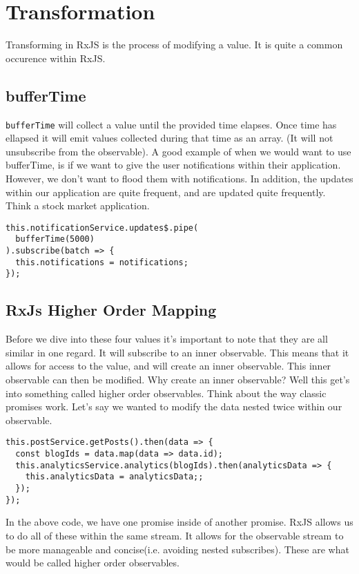 \chapter{Transformation}
Transforming in RxJS is the process of modifying a value. It is quite 
a common occurence within RxJS.

\section{bufferTime}
\lstinline{bufferTime} will collect a value until the provided time elapses. 
Once time has ellapsed it will emit values collected during that time as an 
array. (It will not unsubscribe from the observable). A good example of when we
would want to use bufferTime, is if we want to give the user notifications 
within their application. However, we don't want to flood them with 
notifications. In addition, the updates within our application are quite 
frequent, and are updated quite frequently. Think a stock market application.

\begin{lstlisting}
this.notificationService.updates$.pipe(
  bufferTime(5000)
).subscribe(batch => {
  this.notifications = notifications;
});  
\end{lstlisting}

\section{RxJs Higher Order Mapping}
Before we dive into these four values it's important to note that they are 
all similar in one regard. It will subscribe to an inner observable. This 
means that it allows for access to the value, and will create an inner 
observable. This inner observable can then be modified. Why create an inner
observable? Well this get's into something called higher order observables. 
Think about the way classic promises work. Let's say we wanted to modify the 
data nested twice within our observable.
\begin{lstlisting}
this.postService.getPosts().then(data => {
  const blogIds = data.map(data => data.id);
  this.analyticsService.analytics(blogIds).then(analyticsData => {
    this.analyticsData = analyticsData;; 
  });
});  
\end{lstlisting}

In the above code, we have one promise inside of another promise. RxJS allows us
to do all of these within the same stream. It allows for the observable stream
to be more manageable and concise(i.e. avoiding nested subscribes). These are
what would be called higher order observables. 

